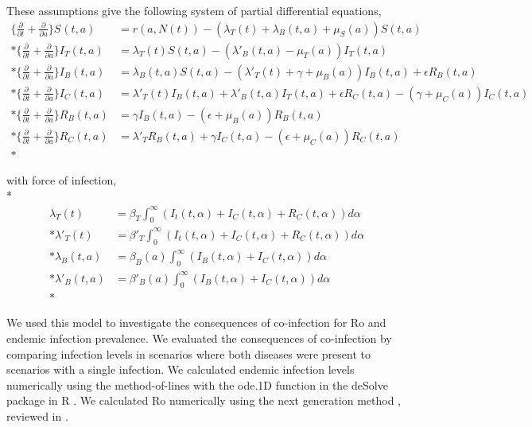 \documentclass[10pt,letterpaper]{article}
\begin{document}
\noindent
These assumptions give the following system of partial differential equations, \\
\begin{align*}
\Big \{ \frac{\partial}{\partial t} + \frac{\partial}{\partial a} \Big \} S_{}(t, a) &= r(a, N(t)) - (\lambda_{T}(t) + \lambda_{B}(t, a) + \mu_{S}(a)) S(t, a) \\*         
\Big \{ \frac{\partial}{\partial t} + \frac{\partial}{\partial a} \Big \} I_{T}(t, a)&= \lambda_{T}(t) S(t, a) -  (\lambda'_{B}(t, a) - \mu_{T}(a)) I_{T}(t, a) \\*
\Big \{ \frac{\partial}{\partial t} + \frac{\partial}{\partial a} \Big \}  I_{B}(t, a)&=  \lambda_{B}(t, a) S(t, a) - (\lambda'_{T}(t) + \gamma + \mu_{B}(a)) I_{B}(t, a) + \epsilon R_{B}(t, a) \\*
\Big \{ \frac{\partial }{\partial t} + \frac{\partial}{\partial a} \Big \}  I_{C}(t, a)&= \lambda'_{T}(t) I_{B}(t,a) + \lambda'_{B}(t, a) I_{T}(t, a) + \epsilon R_{C}(t, a) - (\gamma + \mu_{C}(a)) I_{C}(t, a) \\*
\Big \{ \frac{\partial}{\partial t} + \frac{\partial}{\partial a} \Big \}  R_{B}(t, a)&=  \gamma I_{B}(t, a) - (\epsilon + \mu_{B}(a)) R_{B}(t, a) \\*            
\Big \{ \frac{\partial}{\partial t} + \frac{\partial}{\partial a} \Big \} R_{C}(t, a)&=  \lambda'_{T} R_{B}(t, a) + \gamma I_{C}(t, a) - (\epsilon + \mu_{C}(a)) R_{C}(t, a) \\* 
\end{align*}

\noindent
with force of infection, \\*
\begin{align*}
\lambda_{T}(t) &= \beta_T \int_{0}^{\infty} (I_t(t,\alpha) + I_{C}(t,\alpha) + R_{C}(t, \alpha)) d\alpha\\*
\lambda'_{T}(t) &= \beta'_T \int_{0}^{\infty} (I_t(t,\alpha) + I_{C}(t,\alpha) + R_{C}(t, \alpha)) d\alpha\\*
\lambda_{B}(t, a) &= \beta_{B}(a) \int_{0}^{\infty} (I_{B}(t,\alpha) + I_{C}(t,\alpha)) d\alpha\\*
\lambda'_{B}(t, a) &= \beta'_{B}(a) \int_{0}^{\infty} (I_{B}(t,\alpha) + I_{C}(t,\alpha)) d\alpha\\*
\end{align*}


We used this model to investigate the consequences of co-infection for Ro and endemic infection prevalence. 
We evaluated the consequences of co-infection by comparing infection levels in scenarios where both diseases were present to scenarios with a single infection.
We calculated endemic infection levels numerically using the method-of-lines with the ode.1D function in the deSolve package in R \cite{desolve_package}.
We calculated Ro numerically using the next generation method \cite{van_den_driessche_reproduction_2002}, reviewed in \cite{heffernan_perspectives_2005}.
\end{document}

